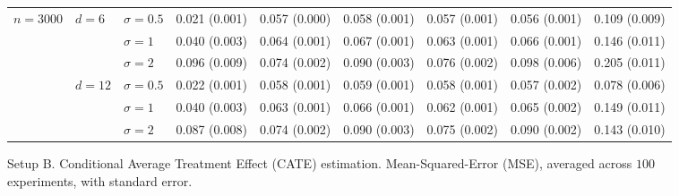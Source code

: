 \documentclass[11pt]{article} %
\theoremstyle{theorem}  %
\theoremstyle{plain}
\begin{document}
\begin{figure}[H]
\begin{tabular}{lllllllll}
\cline{1-9}
\cline{2-9}
\multirow{6}{*}{$n=3000$} & \multirow{3}{*}{$d=6$} & $\sigma=0.5$ &  0.021 (0.001) &  0.057 (0.000) &  0.058 (0.001) &  0.057 (0.001) &  0.056 (0.001) &  0.109 (0.009) \\
         &        & $\sigma=1$ &  0.040 (0.003) &  0.064 (0.001) &  0.067 (0.001) &  0.063 (0.001) &  0.066 (0.001) &  0.146 (0.011) \\
         &        & $\sigma=2$ &  0.096 (0.009) &  0.074 (0.002) &  0.090 (0.003) &  0.076 (0.002) &  0.098 (0.006) &  0.205 (0.011) \\
\cline{2-9}
         & \multirow{3}{*}{$d=12$} & $\sigma=0.5$ &  0.022 (0.001) &  0.058 (0.001) &  0.059 (0.001) &  0.058 (0.001) &  0.057 (0.002) &  0.078 (0.006) \\
         &        & $\sigma=1$ &  0.040 (0.003) &  0.063 (0.001) &  0.066 (0.001) &  0.062 (0.001) &  0.065 (0.002) &  0.149 (0.011) \\
         &        & $\sigma=2$ &  0.087 (0.008) &  0.074 (0.002) &  0.090 (0.003) &  0.075 (0.002) &  0.090 (0.002) &  0.143 (0.010) \\
\bottomrule
\end{tabular}

\caption{Setup B. Conditional Average Treatment Effect (CATE) estimation. Mean-Squared-Error (MSE), averaged across $100$ experiments, with standard error.}
\label{fig:setupB-cate}
\end{figure}
\end{document}
